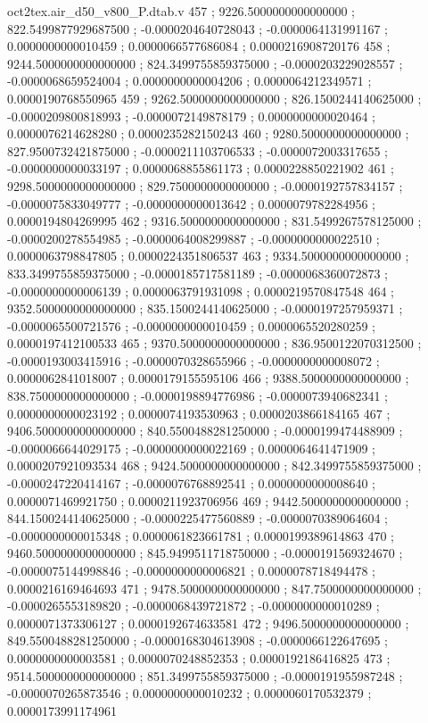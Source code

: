 \begin{filecontents}[overwrite]{oct2tex.air_d50_v800_P.dtab.v}
457 ; 9226.5000000000000000 ; 822.5499877929687500 ; -0.0000204640728043 ; -0.0000064131991167 ; 0.0000000000010459 ; 0.0000066577686084 ; 0.0000216908720176
458 ; 9244.5000000000000000 ; 824.3499755859375000 ; -0.0000203229028557 ; -0.0000068659524004 ; 0.0000000000004206 ; 0.0000064212349571 ; 0.0000190768550965
459 ; 9262.5000000000000000 ; 826.1500244140625000 ; -0.0000209800818993 ; -0.0000072149878179 ; 0.0000000000020464 ; 0.0000076214628280 ; 0.0000235282150243
460 ; 9280.5000000000000000 ; 827.9500732421875000 ; -0.0000211103706533 ; -0.0000072003317655 ; -0.0000000000033197 ; 0.0000068855861173 ; 0.0000228850221902
461 ; 9298.5000000000000000 ; 829.7500000000000000 ; -0.0000192757834157 ; -0.0000075833049777 ; -0.0000000000013642 ; 0.0000079782284956 ; 0.0000194804269995
462 ; 9316.5000000000000000 ; 831.5499267578125000 ; -0.0000200278554985 ; -0.0000064008299887 ; -0.0000000000022510 ; 0.0000063798847805 ; 0.0000224351806537
463 ; 9334.5000000000000000 ; 833.3499755859375000 ; -0.0000185717581189 ; -0.0000068360072873 ; -0.0000000000006139 ; 0.0000063791931098 ; 0.0000219570847548
464 ; 9352.5000000000000000 ; 835.1500244140625000 ; -0.0000197257959371 ; -0.0000065500721576 ; -0.0000000000010459 ; 0.0000065520280259 ; 0.0000197412100533
465 ; 9370.5000000000000000 ; 836.9500122070312500 ; -0.0000193003415916 ; -0.0000070328655966 ; -0.0000000000008072 ; 0.0000062841018007 ; 0.0000179155595106
466 ; 9388.5000000000000000 ; 838.7500000000000000 ; -0.0000198894776986 ; -0.0000073940682341 ; 0.0000000000023192 ; 0.0000074193530963 ; 0.0000203866184165
467 ; 9406.5000000000000000 ; 840.5500488281250000 ; -0.0000199474488909 ; -0.0000066644029175 ; -0.0000000000022169 ; 0.0000064641471909 ; 0.0000207921093534
468 ; 9424.5000000000000000 ; 842.3499755859375000 ; -0.0000247220414167 ; -0.0000076768892541 ; 0.0000000000008640 ; 0.0000071469921750 ; 0.0000211923706956
469 ; 9442.5000000000000000 ; 844.1500244140625000 ; -0.0000225477560889 ; -0.0000070389064604 ; -0.0000000000015348 ; 0.0000061823661781 ; 0.0000199389614863
470 ; 9460.5000000000000000 ; 845.9499511718750000 ; -0.0000191569324670 ; -0.0000075144998846 ; -0.0000000000006821 ; 0.0000078718494478 ; 0.0000216169464693
471 ; 9478.5000000000000000 ; 847.7500000000000000 ; -0.0000265553189820 ; -0.0000068439721872 ; -0.0000000000010289 ; 0.0000071373306127 ; 0.0000192674633581
472 ; 9496.5000000000000000 ; 849.5500488281250000 ; -0.0000168304613908 ; -0.0000066122647695 ; 0.0000000000003581 ; 0.0000070248852353 ; 0.0000192186416825
473 ; 9514.5000000000000000 ; 851.3499755859375000 ; -0.0000191955987248 ; -0.0000070265873546 ; 0.0000000000010232 ; 0.0000060170532379 ; 0.0000173991174961

\end{filecontents}
